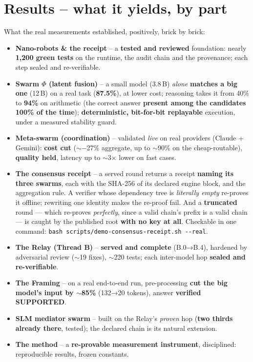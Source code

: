 \documentclass[11pt]{article}
\begin{document}
\section{Results -- what it yields, by part}
What the real measurements established, positively, brick by brick:
\begin{itemize}[leftmargin=1.3em,itemsep=2.5pt,topsep=3pt,label=\textendash]
\item \textbf{Nano-robots \& the receipt} -- a \textbf{tested and reviewed} foundation: nearly
\textbf{1,200 green tests} on the runtime, the audit chain and the provenance; each step sealed and
re-verifiable.
\item \textbf{Swarm $\Phi$ (latent fusion)} -- a small model (3.8\,B) \emph{alone} \textbf{matches a
big one} (12\,B) on a real task (\textbf{87.5\%}), at lower cost; reasoning takes it from 40\% to
\textbf{94\%} on arithmetic (the correct answer \textbf{present among the candidates 100\% of the
time}); \textbf{deterministic, bit-for-bit replayable} execution, under a measured stability guard.
\item \textbf{Meta-swarm (coordination)} -- validated \emph{live} on real providers (Claude +
Gemini): \textbf{cost cut} ($\sim$−27\% aggregate, up to $\sim$90\% on the cheap-routable),
\textbf{quality held}, latency up to $\sim$3× lower on fast cases.
\item \textbf{The consensus receipt} -- a served round returns a receipt \textbf{naming its three
swarms}, each with the SHA-256 of its declared engine block, and the aggregation rule. A verifier
whose dependency tree is \emph{literally empty} re-proves it offline; rewriting one identity makes
the re-proof fail. And a \textbf{truncated} round --- which re-proves \emph{perfectly}, since a valid
chain's prefix is a valid chain --- is caught by the published root \textbf{with no key at all}.
Checkable in one command: \texttt{bash scripts/demo-consensus-receipt.sh -{}-real}.
\item \textbf{The Relay (Thread B)} -- \textbf{served and complete} (B.0→B.4), hardened by adversarial
review ($\sim$19 fixes), $\sim$220 tests; each inter-model hop \textbf{sealed and re-verifiable}.
\item \textbf{The Framing} -- on a real end-to-end run, pre-processing \textbf{cut the big model's
input by $\sim$85\%} (132→20 tokens), answer \textbf{verified SUPPORTED}.
\item \textbf{SLM mediator swarm} -- built on the Relay's \emph{proven} hop (\textbf{two thirds
already there}, tested); the declared chain is its natural extension.
\item \textbf{The method} -- a \textbf{re-provable measurement instrument}, disciplined: reproducible
results, frozen constants.
\end{itemize}
\end{document}
